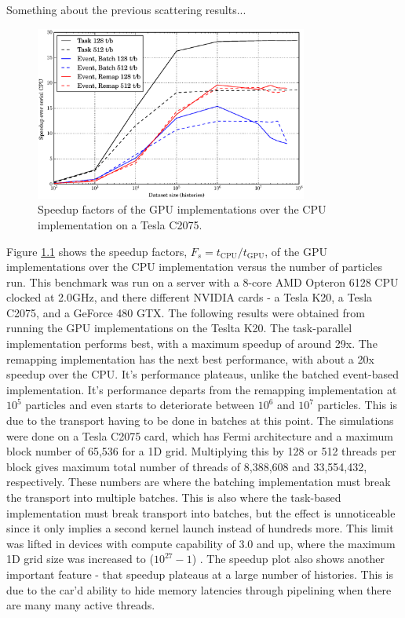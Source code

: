 \chapter{}

Something about the previous scattering results...

\begin{figure}[h!] 
  \centering
    \includegraphics[width=0.8\textwidth]{graphics/prelim_speedup_old.eps}
     \caption{Speedup factors of the GPU implementations over the CPU implementation on a Tesla C2075. \label{prelim_speedup_old} }
\end{figure}

Figure \ref{prelim_speedup_old} shows the speedup factors, $F_s=t_\mathrm{CPU}/t_\mathrm{GPU}$, of the GPU implementations over the CPU implementation versus the number of particles run.  This benchmark was run on a server with a 8-core AMD Opteron 6128 CPU clocked at 2.0GHz, and there different NVIDIA cards - a Tesla K20, a Tesla C2075, and a GeForce 480 GTX.  The following results were obtained from running the GPU implementations on the Teslta K20.  The task-parallel implementation performs best, with a maximum speedup of around 29x.  The remapping implementation has the next best performance, with about a 20x speedup over the CPU.  It's performance plateaus, unlike the batched event-based implementation.  It's performance departs from the remapping implementation at $10^5$ particles and even starts to deteriorate between $10^6$ and $10^7$ particles.  This is due to the transport having to be done in batches at this point.  The simulations were done on a Tesla C2075 card, which has Fermi architecture and a maximum block number of 65,536 for a 1D grid.  Multiplying this by 128 or 512 threads per block gives maximum total number of threads of 8,388,608 and 33,554,432, respectively.  These numbers are where the batching implementation must break the transport into multiple batches.  This is also where the task-based implementation must break transport into batches, but the effect is unnoticeable since it only implies a second kernel launch instead of hundreds more.  This limit was lifted in devices with compute capability of 3.0 and up, where the maximum 1D grid size was increased to ($10^{27}-1$) \cite{cuda}.  The speedup plot also shows another important feature - that speedup plateaus at a large number of histories.  This is due to the car'd ability to hide memory latencies through pipelining when there are many many active threads.  

